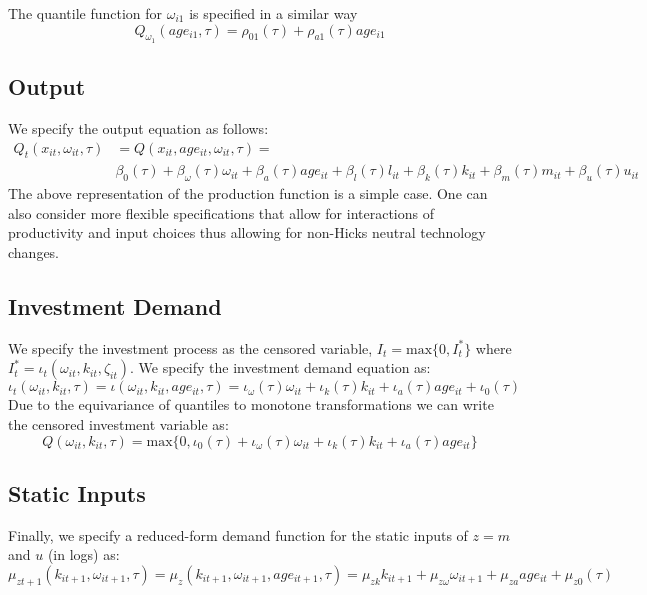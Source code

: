 \documentclass{article}
\begin{document}
\noindent The quantile function for $\omega_{i1}$ is specified in a similar way
\begin{equation}
\label{omega1model}
Q_{\omega_{1}}(age_{i1}, \tau)=\rho_{01}(\tau)+\rho_{a1}(\tau)age_{i1}
\end{equation}

\subsection{Output}
We specify the output equation as follows:
\begin{equation}\label{ymodel}
\begin{split}
Q_{t}(x_{it}, \omega_{it}, \tau)&=Q(x_{it}, age_{it}, \omega_{it}, \tau)=\\
&\beta_{0}(\tau)+\beta_{\omega}(\tau)\omega_{it}+\beta_{a}(\tau)age_{it}+\beta_{l}(\tau)l_{it}+\beta_{k}(\tau)k_{it}+\beta_{m}(\tau)m_{it}+\beta_{u}(\tau)u_{it}
\end{split}
\end{equation}
The above representation of the production function is a simple case. One can also consider more flexible specifications that allow for interactions of productivity and input choices thus allowing for non-Hicks neutral technology changes.

\subsection{Investment Demand}
We specify the investment process as the censored variable, $I_{t}=\text{max}\{0, I^{*}_{t}\}$ where $I_{t}^{*}=\iota_{t}(\omega_{it}, k_{it}, \zeta_{it})$. We specify the investment demand equation as:
\begin{equation}\label{imodel}
\iota_{t}(\omega_{it}, k_{it}, \tau)=\iota(\omega_{it}, k_{it}, age_{it}, \tau)=\iota_{\omega}(\tau)\omega_{it}+\iota_{k}(\tau)k_{it}+\iota_{a}(\tau)age_{it}+\iota_{0}(\tau)
\end{equation}
Due to the equivariance of quantiles to monotone transformations we can write the censored investment variable as:
\begin{equation}\label{censormodel}
Q(\omega_{it}, k_{it}, \tau)=\text{max}\{0, \iota_{0}(\tau)+\iota_{\omega}(\tau)\omega_{it}+\iota_{k}(\tau)k_{it}+\iota_{a}(\tau)age_{it}\}
\end{equation}

\subsection{Static Inputs}
Finally, we specify a reduced-form demand function for the static inputs of $z=m$ and $u$ (in logs) as:
\begin{equation}\label{staticmodel}
\mu_{zt+1}(k_{it+1}, \omega_{it+1}, \tau)=\mu_{z}(k_{it+1}, \omega_{it+1}, age_{it+1}, \tau)=\mu_{zk}k_{it+1}+\mu_{z\omega}\omega_{it+1}+\mu_{za}age_{it}+\mu_{z0}(\tau)
\end{equation}
\end{document}
